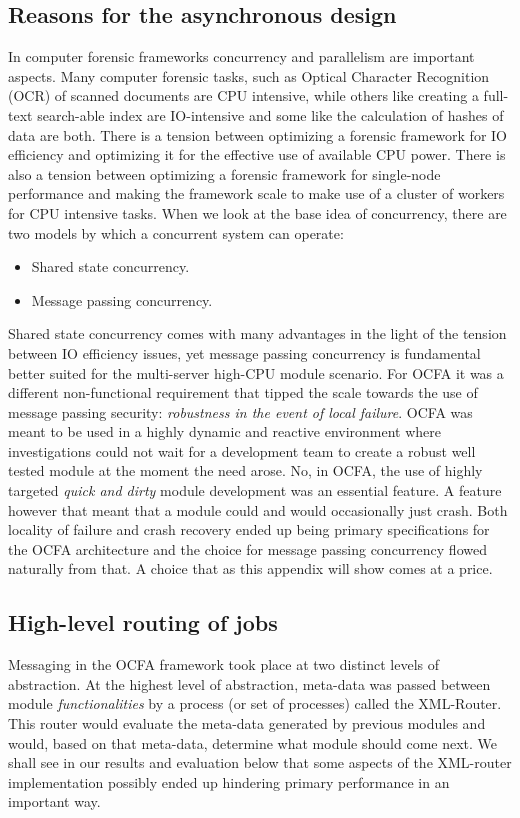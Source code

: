 \subsection{Reasons for the asynchronous design}
In computer forensic frameworks concurrency and parallelism are important aspects. Many computer forensic tasks, such as Optical Character Recognition (OCR) of scanned documents are CPU intensive, while others like creating a full-text search-able index are IO-intensive and some like the calculation of hashes of data are both. There is a tension between optimizing a forensic framework for IO efficiency and optimizing it for the effective use of available CPU power. There is also a tension between optimizing a forensic framework for single-node performance and making the framework scale to make use of a cluster of workers for CPU intensive tasks. When we look at the base idea of concurrency, there are two models by which a concurrent system can operate: 
\begin{itemize}
\item Shared state concurrency.
\item Message passing concurrency.
\end{itemize}
Shared state concurrency comes with many advantages in the light of the tension between IO efficiency issues, yet message passing concurrency is fundamental better suited for the multi-server high-CPU module scenario. For OCFA it was a different non-functional requirement that tipped the scale towards the use of message passing security: \emph{robustness in the event of local failure}. OCFA was meant to be used in
a highly dynamic and reactive environment where investigations could not wait for a development team to create a robust well tested module at the moment the need arose. No, in OCFA, the use of highly targeted \emph{quick and dirty} module development was an essential feature. A feature however that meant that a module could and would occasionally just crash. Both locality of failure and crash recovery ended up being primary specifications for the OCFA architecture and the choice for message passing concurrency flowed naturally from that. A choice that as this appendix will show comes at a price.
\subsection{High-level routing of jobs}
Messaging in the OCFA framework took place at two distinct levels of abstraction. At the highest level of abstraction, meta-data was passed between module \emph{functionalities} by a process (or set of processes) called the XML-Router. This router would evaluate the meta-data generated by previous modules and would, based on that meta-data, determine what module should come next. We shall see in our results and evaluation below that some aspects of the XML-router implementation possibly ended up hindering primary performance in an important way.
